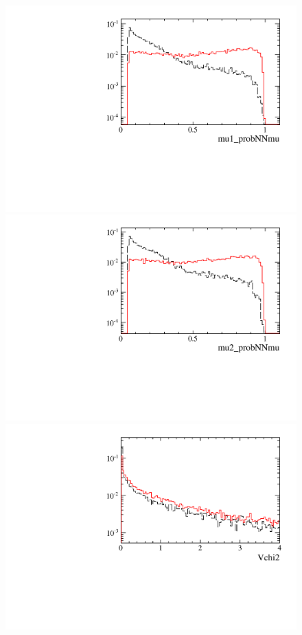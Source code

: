 \begin{figure} [htb!]
\begin{center}
\includegraphics[scale=0.20]{figs/mu1_probNNmuFULL.pdf}
\includegraphics[scale=0.20]{figs/mu2_probNNmuFULL.pdf}
\includegraphics[scale=0.20]{figs/Vchi2FULL.pdf}

\end{center}
\end{figure}
